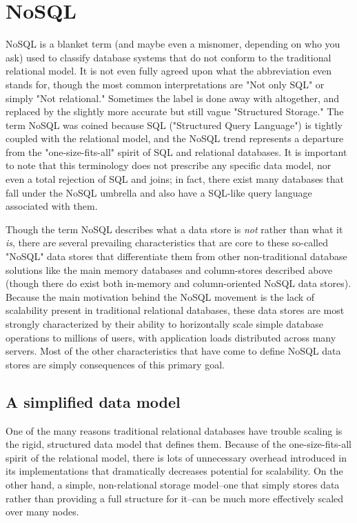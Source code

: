 \documentclass[11pt,a4paper]{report}
\begin{document}
\section{NoSQL}
NoSQL is a blanket term (and maybe even a misnomer, depending on who you ask) used to classify database systems that do not conform to the traditional relational model. It is not even fully agreed upon what the abbreviation even stands for, though the most common interpretations are "Not only SQL" or simply "Not relational."\cite{cattell2011scalable} Sometimes the label is done away with altogether, and replaced by the slightly more accurate but still vague "Structured Storage." The term NoSQL was coined because SQL ("Structured Query Language") is tightly coupled with the relational model, and the NoSQL trend represents a departure from the "one-size-fits-all" spirit of SQL and relational databases.\cite{strauch2011nosql}  It is important to note that this terminology does not prescribe any specific data model, nor even a total rejection of SQL and joins; in fact, there exist many databases that fall under the NoSQL umbrella and also have a SQL-like query language associated with them. 

Though the term NoSQL describes what a data store is \textit{not} rather than what it \textit{is}, there are several prevailing characteristics that are core to these so-called "NoSQL" data stores that differentiate them from other non-traditional database solutions like the main memory databases and column-stores described above (though there do exist both in-memory and column-oriented NoSQL data stores). Because the main motivation behind the NoSQL movement is the lack of scalability present in traditional relational databases, these data stores are most strongly characterized by their ability to horizontally scale simple database operations to millions of users, with application loads distributed across many servers.\cite{strauch2011nosql} Most of the other characteristics that have come to define NoSQL data stores are simply consequences of this primary goal.

\subsection{A simplified data model}
One of the many reasons traditional relational databases have trouble scaling is the rigid, structured data model that defines them. Because of the one-size-fits-all spirit of the relational model, there is lots of unnecessary overhead introduced in its implementations that dramatically decreases potential for scalability. On the other hand, a simple, non-relational storage model--one that simply stores data rather than providing a full structure for it--can be much more effectively scaled over many nodes. 
\end{document}
